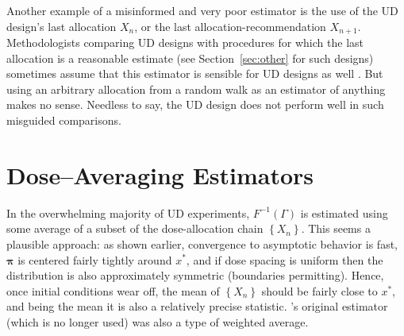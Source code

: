 Another example of a misinformed and very poor estimator is the use of the UD design's last allocation $X_n$, or the last allocation-recommendation $X_{n+1}$.  Methodologists comparing UD designs with procedures for which the last allocation is a reasonable estimate (see Section~\ref{sec:other} for such designs) sometimes assume that this estimator is sensible for UD designs as well \citep{O'Qu:Chev:meth:1991,Zack:stag:2009}. But using an arbitrary allocation from a random walk as an estimator of anything makes no sense. Needless to say, the UD design does not perform well in such misguided comparisons.


\section{Dose--Averaging Estimators}\label{sec:averaging}

In the overwhelming majority of UD experiments, $F^{-1}(\Gamma)$ is estimated using some average of a subset of the dose-allocation chain $\left\{X_n\right\}$. This seems a plausible approach: as shown earlier, convergence to asymptotic behavior is fast, $\boldsymbol{\pi}$ is centered fairly tightly around $x^*$, and if dose spacing is uniform then the distribution is also approximately symmetric (boundaries permitting). Hence, once initial conditions wear off, the mean of $\left\{X_n\right\}$ should be fairly close to $x^*$, and being the mean it is also a relatively precise statistic. \cite{Dixo:Mood:Amet:1948}'s original estimator (which is no longer used) was also a type of weighted average.

